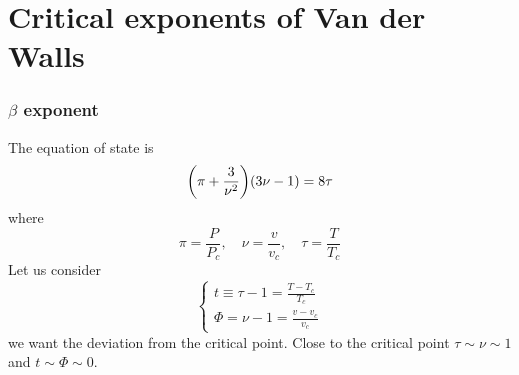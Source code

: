 \documentclass[../main/main.tex]{subfiles}
\begin{document}
\section{Critical exponents of Van der Walls}

\subsubsection{\( \beta  \) exponent}
The equation of state is
\begin{equation}
  \qty(\pi + \frac{3}{\nu ^2}) \qty(3 \nu - 1) = 8 \tau
\end{equation}
where
\begin{equation}
  \pi = \frac{P}{P_c}, \quad \nu = \frac{v }{v_c}, \quad \tau = \frac{T}{T_c}
\end{equation}
Let us consider
\begin{equation}
  \begin{cases}
   t \equiv \tau -1 = \frac{T-T_c}{T_c} \\
   \Phi = \nu -1 = \frac{v-v_c}{v_c}
  \end{cases}
\end{equation}
we want the deviation from the critical point.
Close to the critical point \( \tau \sim \nu \sim 1 \) and \( t \sim \Phi \sim 0 \).
\end{document}
